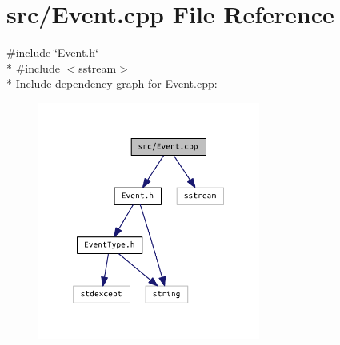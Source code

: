 \section{src/\+Event.cpp File Reference}
\label{_event_8cpp}
{\ttfamily \#include \char`\"{}Event.\+h\char`\"{}}\\*
{\ttfamily \#include $<$sstream$>$}\\*
Include dependency graph for Event.\+cpp\+:\nopagebreak
\begin{figure}[H]
\begin{center}
\leavevmode
\includegraphics[width=207pt]{_event_8cpp__incl}
\end{center}
\end{figure}
